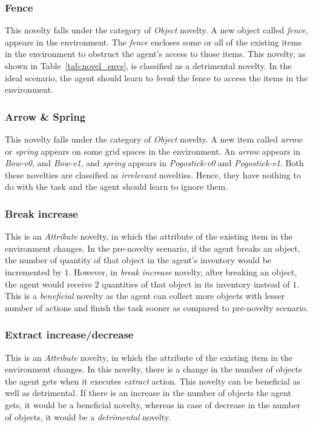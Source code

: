 \documentclass[sigconf]{aamas}
\begin{document}
\subsubsection{Fence}
\label{Fence}

This novelty falls under the category of \emph{Object} novelty. A new object called \emph{fence}, appears in the environment. The \emph{fence} encloses some or all of the existing items in the environment to obstruct the agent's access to those items. This novelty, as shown in Table~\ref{tab:novel_envs}, is classified as a detrimental novelty. In the ideal scenario, the agent should learn to \emph{break} the fence to access the items in the environment.

\subsubsection{Arrow \& Spring}

This novelty falls under the category of \emph{Object} novelty.
A new item called \emph{arrow} or \emph{spring} appears on some grid spaces in the environment. An \emph{arrow} appears in \emph{Bow-v0}, and \emph{Bow-v1}, and \emph{spring} appears in \emph{Pogostick-v0} and \emph{Pogostick-v1}. Both these novelties are classified as \emph{irrelevant} novelties. Hence, they have nothing to do with the task and the agent should learn to ignore them.

\subsubsection{Break increase}

This is an \emph{Attribute} novelty, in which the attribute of the existing item in the environment changes. In the pre-novelty scenario, if the agent breaks an object, the number of quantity of that object in the agent's inventory would be incremented by $1$.
However, in \emph{break increase} novelty, after breaking an object, the agent would receive $2$ quantities of that object in its inventory instead of $1$. This is a \emph{beneficial} novelty as the agent can collect more objects with lesser number of actions and finish the task sooner as compared to pre-novelty scenario.

\subsubsection{Extract increase/decrease}

This is an \emph{Attribute} novelty, in which the attribute of the existing item in the environment changes.
In this novelty, there is a change in the number of objects the agent gets when it executes \emph{extract} action.
This novelty can be beneficial as well as detrimental. If there is an increase in the number of objects the agent gets, it would be a beneficial novelty, whereas in case of decrease in the number of objects, it would be a \emph{detrimental} novelty.
\end{document}

